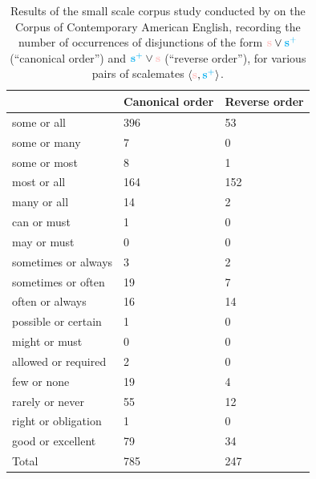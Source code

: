 \begin{table}[H]
	\centering
	\begin{tabular}{lll}\toprule
		& Canonical order & Reverse order \\ \midrule
		some or all         & 396             & 53            \\
		some or many        & 7               & 0             \\
		some or most        & 8               & 1             \\
		most or all         & 164             & 152           \\
		many or all         & 14              & 2             \\
		can or must         & 1               & 0             \\
		may or must         & 0               & 0             \\
		sometimes or always & 3               & 2             \\
		sometimes or often  & 19              & 7             \\
		often or always     & 16              & 14            \\
		possible or certain & 1               & 0             \\
		might or must       & 0               & 0             \\
		allowed or required & 2               & 0             \\
		few or none         & 19              & 4             \\
		rarely or never     & 55              & 12            \\
		right or obligation & 1               & 0             \\
		good or excellent   & 79              & 34            \\
		Total               & 785             & 247         \\ \bottomrule
	\end{tabular}
	\caption{Results of the small scale corpus study conducted by \textcite{Fox2018a} on the Corpus of Contemporary American English, recording the number of occurrences of disjunctions of the form $\s \vee \splus$ (``canonical order'') and $\splus \vee \s$ (``reverse order''), for various pairs of scalemates $\langle\s, \splus\rangle$.}\label{tab7:fs-counts}
\end{table}

